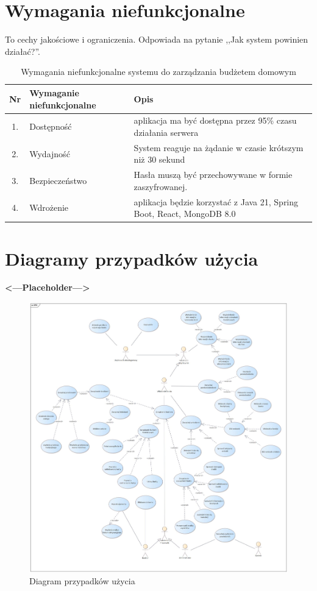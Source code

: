 \section{Wymagania niefunkcjonalne}
To cechy jakościowe i ograniczenia. Odpowiada na pytanie ,,Jak system powinien działać?''.
\begin{table}[H]
	\centering
	\renewcommand{\arraystretch}{1.3}
	\setlength{\tabcolsep}{6pt}
	\begin{tabular}{|c|p{5cm}|p{8cm}|}
		\hline
		\textbf{Nr} & \textbf{Wymaganie niefunkcjonalne} & \textbf{Opis} \\ \hline
		
		1. & Dostępność & aplikacja ma być dostępna przez 95\% czasu działania serwera \\ \hline
		2. & Wydajność & System reaguje na żądanie w czasie krótszym niż 30 sekund \\ \hline
		3. & Bezpieczeństwo & Hasła muszą być przechowywane w formie zaszyfrowanej. \\ \hline
		4. & Wdrożenie & aplikacja będzie korzystać z Java 21, Spring Boot, React, MongoDB 8.0 \\ \hline
		
	\end{tabular}
	\caption{Wymagania niefunkcjonalne systemu do zarządzania budżetem domowym}
	\label{tab:wymagania_niefunkcjonalne}
\end{table}
\section{Diagramy przypadków użycia}
\textbf{<---Placeholder--->}
\begin{figure}[H]
	\centering
	\includegraphics[width=1\textwidth]{images/DPU.jpg}
	\caption{Diagram przypadków użycia}
	\label{fig:UseCase}
\end{figure}
